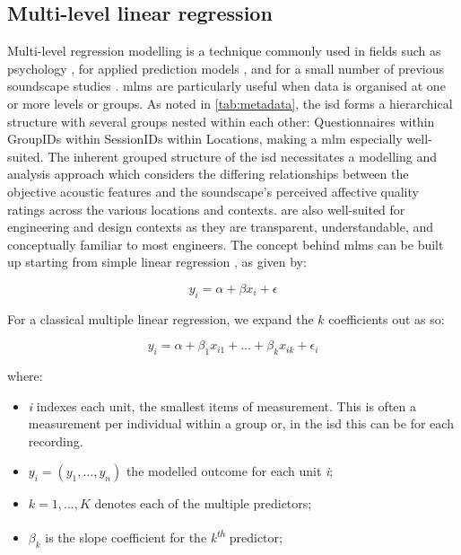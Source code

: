 \subsection{Multi-level linear regression}

Multi-level regression modelling is a technique commonly used in fields such as psychology \citep{Quene2004multi,VolpertEsmond2021Using}, for applied prediction models \citep{Gelman2006Multilevel,Frees2006Multilevel}, and for a small number of previous soundscape studies \citep{Aumond2017Modeling}. \glspl{mlm} are particularly useful when data is organised at one or more levels or groups. As noted in \cref{tab:metadata}, the \gls{isd} forms a hierarchical structure with several groups nested within each other: Questionnaires within GroupIDs within SessionIDs within Locations, making a \gls{mlm} especially well-suited. The inherent grouped structure of the \gls{isd} necessitates a modelling and analysis approach which considers the differing relationships between the objective acoustic features and the soundscape's perceived affective quality ratings across the various locations and contexts.  are also well-suited for engineering and design contexts as they are transparent, understandable, and conceptually familiar to most engineers. The concept behind \glspl{mlm} can be built up starting from simple linear regression \citep{DataAnalysisUsingGelman}, as given by:

\begin{equation}
  y_i = \alpha + \beta x_i + \epsilon
\end{equation}

For a classical multiple linear regression, we expand the $k$ coefficients out as so:

\begin{equation}
  \label{eqn:classicRegressModel}
  y_i = \alpha + \beta_1 x_{i1} + \ldots + \beta_k x_{ik} + \epsilon_i
\end{equation}

where:

\begin{itemize}
  \item \emph{i} indexes each unit, the smallest items of measurement. This is often a measurement per individual within a group or, in the \gls{isd} this can be for each recording.
  \item $y_i = (y_1, \ldots, y_n)$ the modelled outcome for each unit \emph{i};
  \item $k = 1, \dots, K$ denotes each of the multiple predictors;
  \item $\beta_k$ is the slope coefficient for the \emph{k\textsuperscript{th}} predictor;
\end{itemize}

